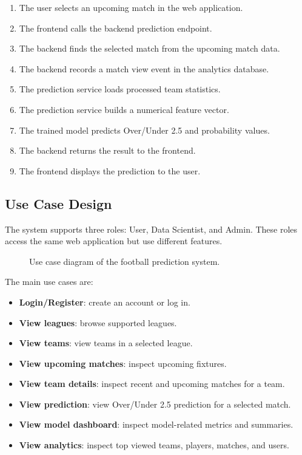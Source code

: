 \begin{enumerate}
    \item The user selects an upcoming match in the web application.
    \item The frontend calls the backend prediction endpoint.
    \item The backend finds the selected match from the upcoming match data.
    \item The backend records a match view event in the analytics database.
    \item The prediction service loads processed team statistics.
    \item The prediction service builds a numerical feature vector.
    \item The trained model predicts Over/Under 2.5 and probability values.
    \item The backend returns the result to the frontend.
    \item The frontend displays the prediction to the user.
\end{enumerate}

\subsection{Use Case Design}
\label{subsec:use-case-design}

The system supports three roles: User, Data Scientist, and Admin. These roles access the same web application but use different features.

\begin{figure}[htbp]
    \centering
    \caption{Use case diagram of the football prediction system.}
    \label{fig:use-case-diagram}
\end{figure}

The main use cases are:

\begin{itemize}
    \item \textbf{Login/Register}: create an account or log in.
    \item \textbf{View leagues}: browse supported leagues.
    \item \textbf{View teams}: view teams in a selected league.
    \item \textbf{View upcoming matches}: inspect upcoming fixtures.
    \item \textbf{View team details}: inspect recent and upcoming matches for a team.
    \item \textbf{View prediction}: view Over/Under 2.5 prediction for a selected match.
    \item \textbf{View model dashboard}: inspect model-related metrics and summaries.
    \item \textbf{View analytics}: inspect top viewed teams, players, matches, and users.
\end{itemize}

